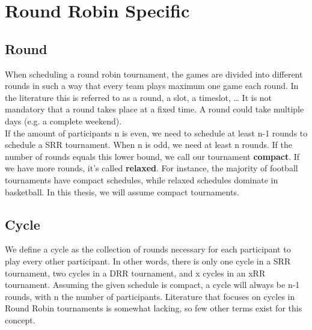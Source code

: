 \section{Round Robin Specific}
\subsection{Round}
When scheduling a round robin tournament, the games are divided into different rounds in such a way that every team plays maximum one game each round. In the literature this is referred to as a round, a slot, a timeslot, … It is not mandatory that a round takes place at a fixed time. A round could take multiple days (e.g. a complete weekend).
\\[5px]
 If the amount of participants n is even, we need to schedule at least n-1 rounds to schedule a SRR tournament. When n is odd, we need at least n rounds. If the number of rounds equals this lower bound, we call our tournament \textbf{compact}. If we have more rounds, it’s called \textbf{relaxed}. For instance, the majority of football tournaments have compact schedules, while relaxed schedules dominate in basketball. In this thesis, we will assume compact tournaments.
 
\subsection{Cycle}
 We define a cycle as the collection of rounds necessary for each participant to play every other participant. In other words, there is only one cycle in a SRR tournament, two cycles in a DRR tournament, and x cycles in an xRR tournament. Assuming the given schedule is compact, a cycle will always be n-1 rounds, with n the number of participants. Literature that focuses on cycles in Round Robin tournaments is somewhat lacking, so few other terms exist for this concept.
 
